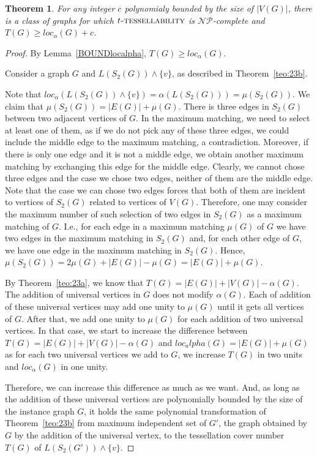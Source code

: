 \documentclass[9pt]{entcs} \usepackage{entcsmacro}
\newtheorem{teo}{Theorem}[section]
\begin{document}
\begin{teo}
\label{teo:afastarnpc}
For any integer $c$ polynomialy bounded by the size of $|V(G)|$, there is a class of graphs for which $\textsc{$t$-tessellability}$ is $\mathcal{NP}$-complete and $T(G) \geq loc_\alpha(G)+c$. 
\end{teo}
\begin{proof}
By Lemma~\ref{BOUNDlocalpha}, $T(G) \geq loc_\alpha(G)$.

Consider a graph $G$ and $L(S_2(G))\land\{v\}$, as described in Theorem~\ref{teo:23b}.

Note that $loc_\alpha(L(S_2(G))\land\{v\}) = \alpha(L(S_2(G))) = \mu(S_2(G))$.
We claim that $\mu(S_2(G)) = |E(G)|+\mu(G)$.
There is three edges in $S_2(G)$ between two adjacent vertices of $G$. In the maximum matching, we need to select at least one of them, as if we do not pick any of these three edges, we could include the middle edge to the maximum matching, a contradiction.
Moreover, if there is only one edge and it is not a middle edge, we obtain another maximum matching by exchanging this edge for the middle edge.
Clearly, we cannot chose three edges and the case we chose two edges, neither of them are the middle edge.
Note that the case we can chose two edges forces that both of them are incident to vertices of $S_2(G)$ related to vertices of $V(G)$.
Therefore, one may consider the maximum number of such selection of two edges in $S_2(G)$  as a maximum matching of $G$.
I.e., for each edge in a maximum matching $\mu(G)$ of $G$ we have two edges in the maximum matching in $S_2(G)$ and, for each other edge of $G$, we have one edge in the maximum matching in $S_2(G)$.
Hence, $\mu(S_2(G)) = 2\mu(G) + |E(G)| - \mu(G) = |E(G)| + \mu(G)$.

By Theorem~\ref{teo:23a}, we know that $T(G) = |E(G)| + |V(G)| - \alpha(G)$.
The addition of universal vertices in $G$ does not modify $\alpha(G)$.
Each of addition of these universal vertices may add one unity to $\mu(G)$ until it gets all vertices of $G$.
After that, we add one unity to $\mu(G)$ for each addition of two universal vertices.
In that case, we start to increase the difference between $T(G) = |E(G)|+|V(G)| - \alpha(G)$ and $loc_alpha(G) = |E(G)| + \mu(G)$ as for each two universal vertices we add to $G$, we increase $T(G)$ in two units and $loc_\alpha(G)$ in one unity.

Therefore, we can increase this difference as much as we want.
And, as long as the addition of these universal vertices are polynomially bounded by the size of the instance graph $G$, it holds the same polynomial transformation of Theorem~\ref{teo:23b} from maximum independent set of $G'$, the graph obtained by $G$ by the addition of the universal vertex, to the tessellation cover number $T(G)$ of $L(S_2(G'))\land\{v\}$.
\end{proof}
\end{document}
